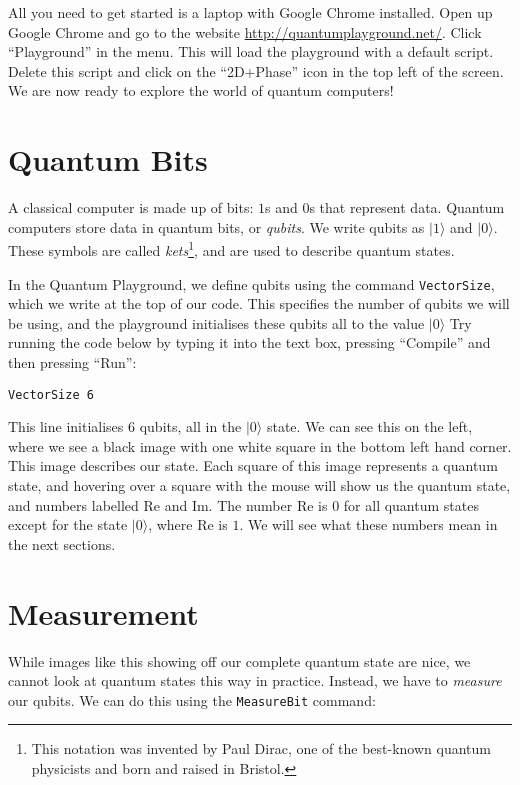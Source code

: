 \documentclass[twocolumn]{article}
\begin{document}
All you need to get started is a laptop with Google Chrome installed. Open up Google Chrome and go to the website \url{http://quantumplayground.net/}. Click ``Playground'' in the menu. This will load the playground with a default script. Delete this script and click on the ``2D+Phase'' icon in the top left of the screen. We are now ready to explore the world of quantum computers!

\section{Quantum Bits}

A classical computer is made up of bits: $1$s and $0$s that represent data. Quantum computers store data in quantum bits, or {\em qubits}. We write qubits as $|1\rangle$ and $|0\rangle$. These symbols are called {\em kets}\footnote{This notation was invented by Paul Dirac, one of the best-known quantum physicists and born and raised in Bristol.}, and are used to describe quantum states.

In the Quantum Playground, we define qubits using the command \texttt{VectorSize}, which we write at the top of our code. This specifies the number of qubits we will be using, and the playground initialises these qubits all to the value $|0\rangle$ Try running the code below by typing it into the text box, pressing ``Compile'' and then pressing ``Run'':

\begin{lstlisting}
VectorSize 6
\end{lstlisting}

This line initialises $6$ qubits, all in the $|0\rangle$ state. We can see this on the left, where we see a black image with one white square in the bottom left hand corner. This image describes our state. Each square of this image represents a quantum state, and hovering over a square with the mouse will show us the quantum state, and numbers labelled Re and Im. The number Re is $0$ for all quantum states except for the state $|0\rangle$, where Re is $1$. We will see what these numbers mean in the next sections.

\section{Measurement}

While images like this showing off our complete quantum state are nice, we cannot look at quantum states this way in practice. Instead, we have to {\em measure} our qubits. We can do this using the \texttt{MeasureBit} command:
\end{document}
